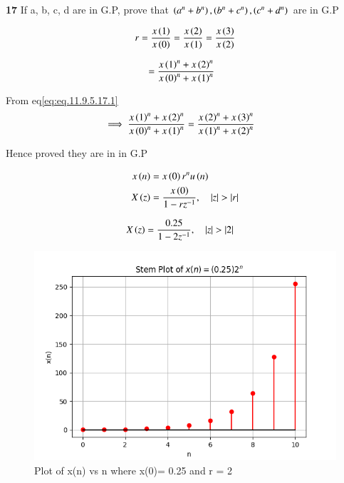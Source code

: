 \documentclass[journal,12pt,twocolumn]{IEEEtran}
\theoremstyle{remark}
\begin{document}


\vspace{3cm}

\title{}
\author{EE23BTECH11047 - Deepakreddy P
}
\maketitle
\newpage
\bigskip

\noindent \textbf{17} \quad 
If a, b, c, d are in G.P, prove that 
$ \left(a^{n} + b^{n}\right),\left(b^{n} + c^{n}\right),\left(c^{n} + d^{n}\right) $ are in G.P \\
\solution

\begin{center}
    \begin{table}[ht]
        
    \end{table}
\end{center}


\begin{align}   
r=\frac{x\left(1\right)}{x\left(0\right)} = \frac{x\left(2\right)}{x\left(1\right)}= \frac{x\left(3\right)}{x\left(2\right)} \label{eq:eq.11.9.5.17.1}
\end{align}

\begin{align} 
   &= \frac{x\left(1\right)^n + x\left(2\right)^n }{x\left(0\right)^n + x\left(1\right)^n}
\end{align}

From eq\eqref{eq:eq.11.9.5.17.1}\\

\begin{align}
\implies \frac{x\left(1\right)^n + x\left(2\right)^n }{x\left(0\right)^n + x\left(1\right)^n} &= \frac{x\left(2\right)^n + x\left(3\right)^n}{x\left(1\right)^n + x\left(2\right)^n}
\end{align}

Hence proved they are in in G.P

\begin{align}
    x\brak{n} &= x\brak{0}r^{n} u\brak{n}\\
    X\brak{z} &= \frac{x\brak{0}}{1-rz^{-1}}, \quad |z|>|r|
\end{align}

\begin{align}
    X\brak{z} &= \frac{0.25}{1-2z^{-1}}, \quad |z|>|2|
\end{align}

\begin{figure}[htbp]
   \centering
   \includegraphics[width=1\columnwidth]{figs/gp.png}
   \caption{Plot of x(n) vs n where x(0)= 0.25 and r = 2}
   \label{fig: Stem plot of x(n)}
\end{figure}
\end{document}

